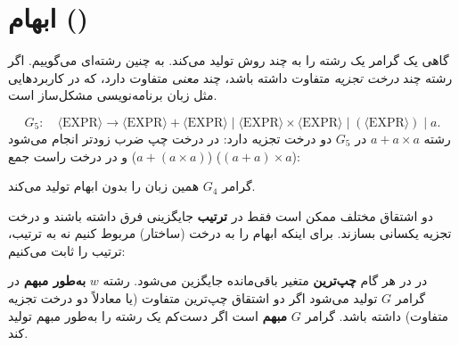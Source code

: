 \section{ابهام ()}

گاهی یک گرامر یک رشته را به چند روش تولید می‌کند. به چنین رشته‌ای  می‌گوییم. اگر رشته چند \emph{درخت تجزیه} متفاوت داشته باشد، چند \emph{معنی} متفاوت دارد، که در کاربردهایی مثل زبان برنامه‌نویسی مشکل‌ساز است.

\begin{example}
\[G_5:\quad\langle\text{EXPR}\rangle\to\langle\text{EXPR}\rangle+\langle\text{EXPR}\rangle\mid\langle\text{EXPR}\rangle\times\langle\text{EXPR}\rangle\mid(\langle\text{EXPR}\rangle)\mid a.\]
رشته $a+a\times a$ در $G_5$ دو درخت تجزیه دارد: در درخت چپ ضرب زودتر انجام می‌شود ($a+(a\times a)$) و در درخت راست جمع ($(a+a)\times a$):
\begin{ltrfig}
\end{ltrfig}
گرامر $G_4$ همین زبان را بدون ابهام تولید می‌کند.
\end{example}

دو اشتقاق مختلف ممکن است فقط در \textbf{ترتیب} جایگزینی فرق داشته باشند و درخت تجزیه یکسانی بسازند. برای اینکه ابهام را به درخت (ساختار) مربوط کنیم نه به ترتیب، ترتیب را ثابت می‌کنیم:

\begin{definition}
در  در هر گام \textbf{چپ‌ترین} متغیر باقی‌مانده جایگزین می‌شود. رشته $w$ \textbf{به‌طور مبهم} در گرامر $G$ تولید می‌شود اگر دو اشتقاق چپ‌ترین متفاوت (یا معادلاً دو درخت تجزیه متفاوت) داشته باشد. گرامر $G$ \textbf{مبهم} است اگر دست‌کم یک رشته را به‌طور مبهم تولید کند.
\end{definition}

